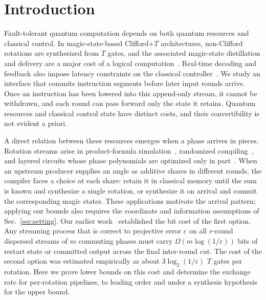 \documentclass[aps,prx,twocolumn,superscriptaddress,nofootinbib,longbibliography]{revtex4-2}
\theoremstyle{plain}
\theoremstyle{definition}
\theoremstyle{remark}
\begin{document}
\maketitle

\section{Introduction}


Fault-tolerant quantum computation depends on both quantum resources and classical control. In magic-state-based Clifford+$T$ architectures, non-Clifford rotations are synthesized from $T$ gates, and the associated magic-state distillation and delivery are a major cost of a logical computation~\cite{BravyiKitaev,BravyiHaah,Litinski,LitinskiDistillation}. Real-time decoding and feedback also impose latency constraints on the classical controller~\cite{Caune,Fowler}. We study an interface that commits instruction segments before later input rounds arrive. Once an instruction has been lowered into this append-only stream, it cannot be withdrawn, and each round can pass forward only the state it retains. Quantum resources and classical control state have distinct costs, and their convertibility is not evident a priori.

A direct relation between these resources emerges when a phase arrives in pieces. Rotation streams arise in product-formula simulation~\cite{ChildsTrotter}, randomized compiling~\cite{WallmanEmerson}, and layered circuits whose phase polynomials are optimized only in part~\cite{AmyMaslovMosca,Nam}. When an upstream producer supplies an angle as additive shares in different rounds, the compiler faces a choice at each share: retain it in classical memory until the sum is known and synthesize a single rotation, or synthesize it on arrival and commit the corresponding magic states. These applications motivate the arrival pattern; applying our bounds also requires the coordinate and information assumptions of Sec.~\ref{sec:setting}. Our earlier work~\cite{Paper1} established the bit cost of the first option. Any streaming process that is correct to projective error $\varepsilon$ on all $r$-round dispersed streams of $m$ commuting phases must carry $\Omega(m\log(1/\varepsilon))$ bits of restart state or committed output across the final inter-round cut. The cost of the second option was estimated empirically as about $3\log_2(1/\varepsilon)$ $T$ gates per rotation. Here we prove lower bounds on this cost and determine the exchange rate for per-rotation pipelines, to leading order and under a synthesis hypothesis for the upper bound.
\end{document}
